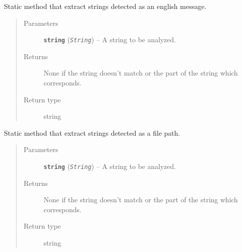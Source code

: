 \documentclass[letterpaper,10pt,oneside]{sphinxmanual}
\begin{document}
\begin{fulllineitems}
\begin{fulllineitems}
\end{fulllineitems}


\begin{fulllineitems}
\label{index:lib.parser.Parser.getMessage}
Static method that extract strings detected as an english message.
\begin{quote}\begin{description}
\item[{Parameters}] \leavevmode
\textbf{\texttt{string}} (\emph{\texttt{String}}) -- A string to be analyzed.

\item[{Returns}] \leavevmode
None if the string doesn't match or the part of the string
which corresponds.

\item[{Return type}] \leavevmode
string

\end{description}\end{quote}

\end{fulllineitems}


\begin{fulllineitems}
\label{index:lib.parser.Parser.getPath}
Static method that extract strings detected as a file path.
\begin{quote}\begin{description}
\item[{Parameters}] \leavevmode
\textbf{\texttt{string}} (\emph{\texttt{String}}) -- A string to be analyzed.

\item[{Returns}] \leavevmode
None if the string doesn't match or the part of the string
which corresponds.

\item[{Return type}] \leavevmode
string

\end{description}\end{quote}

\end{fulllineitems}



\end{fulllineitems}
\end{document}
